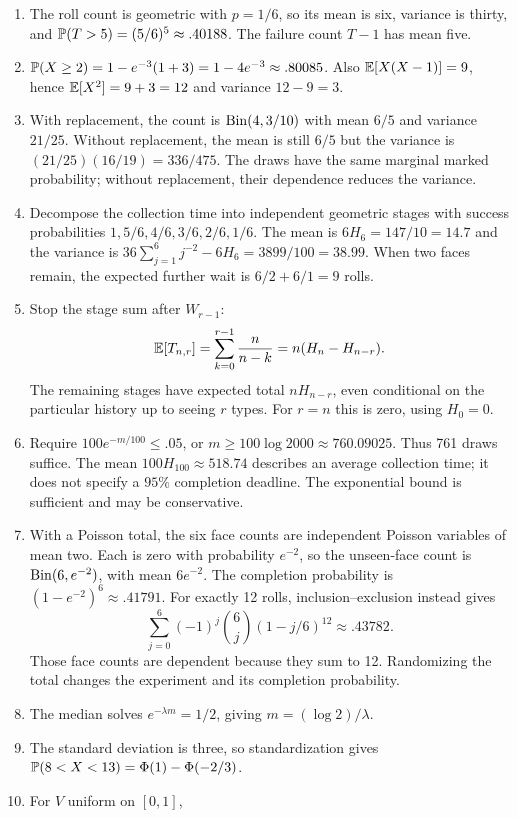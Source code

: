 \begin{enumerate}
 be exactly Poisson, which has an unbounded set of possible counts.
 \item The roll count is geometric with $p=1/6$, so its mean is six,
 variance is thirty, and $\P(T>5)=(5/6)^5\approx.40188$.
 The failure count $T-1$ has mean five.
 \item $\P(X\ge2)=1-e^{-3}(1+3)=1-4e^{-3}\approx.80085$.
 Also $\E[X(X-1)]=9$, hence $\E[X^2]=9+3=12$ and variance $12-9=3$.
 \item With replacement, the count is $\Bin(4,3/10)$ with
 mean $6/5$ and variance $21/25$.
 Without replacement, the mean is still $6/5$ but the variance is
 $(21/25)(16/19)=336/475$.
 The draws have the same marginal marked probability; without
 replacement, their dependence reduces the variance.
 \item Decompose the collection time into independent geometric stages
 with success probabilities $1,5/6,4/6,3/6,2/6,1/6$.
 The mean is $6H_6=147/10=14.7$ and the variance is
 $36\sum_{j=1}^6j^{-2}-6H_6=3899/100=38.99$.
 When two faces remain, the expected further wait is $6/2+6/1=9$ rolls.
 \item Stop the stage sum after $W_{r-1}$:
 \[
  \E[T_{n,r}]=\sum_{k=0}^{r-1}\frac{n}{n-k}
   =n(H_n-H_{n-r}).
 \]
 The remaining stages have expected total $nH_{n-r}$, even conditional
 on the particular history up to seeing $r$ types. For $r=n$ this is
 zero, using $H_0=0$.
 \item Require $100e^{-m/100}\le.05$, or
 $m\ge100\log2000\approx760.09025$.
 Thus 761 draws suffice. The mean $100H_{100}\approx518.74$ describes
 an average collection time; it does not specify a $95\%$ completion
 deadline. The exponential bound is sufficient and may be conservative.
 \item With a Poisson total, the six face counts are independent
 Poisson variables of mean two. Each is zero with probability $e^{-2}$,
 so the unseen-face count is $\Bin(6,e^{-2})$, with mean $6e^{-2}$.
 The completion probability is $(1-e^{-2})^6\approx.41791$.
 For exactly 12 rolls, inclusion--exclusion instead gives
 \[
  \sum_{j=0}^6(-1)^j\binom6j(1-j/6)^{12}\approx.43782.
 \]
 Those face counts are dependent because they sum to 12. Randomizing
 the total changes the experiment and its completion probability.
 \item The median solves $e^{-\lambda m}=1/2$, giving
 $m=(\log2)/\lambda$.
 \item The standard deviation is three, so standardization gives
 $\P(8<X<13)=\Phi(1)-\Phi(-2/3)$.
 \item For $V$ uniform on $[0,1]$,

\end{enumerate}
